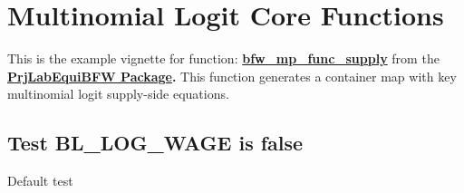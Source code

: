 \documentclass[
]{book}
\begin{document}
\hypertarget{multinomial-logit-core-functions}{%
\section{Multinomial Logit Core Functions}\label{multinomial-logit-core-functions}}

This is the example vignette for function:
\href{https://github.com/FanWangEcon/PrjLabEquiBFW/tree/main/PrjLabEquiBFW/func/bfw_mp_func_supply.m}{\textbf{bfw\_mp\_func\_supply}}
from the \href{https://fanwangecon.github.io/PrjLabEquiBFW/}{\textbf{PrjLabEquiBFW
Package}}\textbf{.} This
function generates a container map with key multinomial logit
supply-side equations.

\hypertarget{test-bl_log_wage-is-false}{%
\subsection{Test BL\_LOG\_WAGE is false}\label{test-bl_log_wage-is-false}}

Default test
\end{document}
